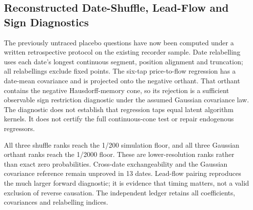 \documentclass[12pt]{article}
\theoremstyle{definition}
\theoremstyle{remark}
\begin{document}
\subsection{Reconstructed Date-Shuffle, Lead-Flow and Sign Diagnostics}
The previously untraced placebo questions have now been computed under a written retrospective protocol on the existing recorder sample. Date relabelling uses each date's longest continuous segment, position alignment and truncation; all relabellings exclude fixed points. The six-tap price-to-flow regression has a date-mean covariance and is projected onto the negative orthant. That orthant contains the negative Hausdorff-memory cone, so its rejection is a sufficient observable sign restriction diagnostic under the assumed Gaussian covariance law. The diagnostic does not establish that regression taps equal latent algorithm kernels. It does not certify the full continuous-cone test or repair endogenous regressors.
\begin{table}[htbp]
\centering\footnotesize\setlength{\tabcolsep}{3pt}
\caption{Reconstructed recorder diagnostics: 199 fixed-point-free whole-date flow relabellings and 1,999 Gaussian vertex draws for the six-tap negative orthant. The printed ranks are simulation diagnostics at finite resolution, not randomized-treatment or finite-sample market $p$ values.}
\label{tab:falsification}
\end{table}

All three shuffle ranks reach the 1/200 simulation floor, and all three Gaussian orthant ranks reach the 1/2000 floor. These are lower-resolution ranks rather than exact zero probabilities. Cross-date exchangeability and the Gaussian covariance reference remain unproved in 13 dates. Lead-flow pairing reproduces the much larger forward diagnostic; it is evidence that timing matters, not a valid exclusion of reverse causation. The independent ledger retains all coefficients, covariances and relabelling indices.
\end{document}
